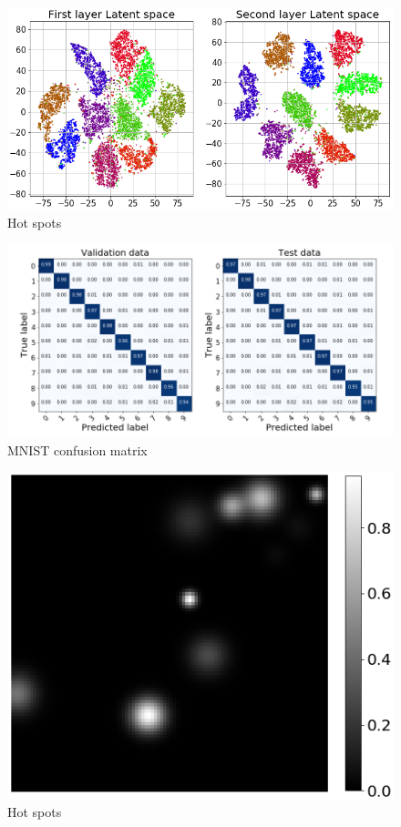 \documentclass{article}
\begin{document}
\begin{figure}[!h]
	\centering
	\includegraphics[width=1\linewidth]{figures_3/latent_space_finetune_no_legend.png}  
	\caption{Hot spots}
\end{figure}


\begin{figure}[!h]
	\includegraphics[width=1\linewidth]{figures_3/Confusion_matrix_fine_tune.png}  
	\caption{MNIST confusion matrix}
\end{figure}

\begin{figure}[!h]
    \centering
	\includegraphics[width=0.5\linewidth]{figures_3/raman_sim_hotspots.png}  
	\caption{Hot spots}
\end{figure}
\end{document}
